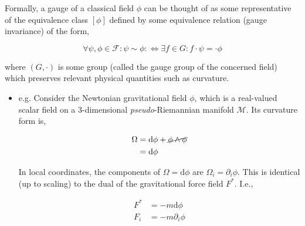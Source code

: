 \documentclass[9pt,handout]{beamer}
\begin{document}
\begin{frame}{}
\begin{definition}
Formally, a gauge of a classical field $\phi$ can be thought of as some representative of the equivalence class $\left[ \phi \right]$ defined by some equivalence relation (gauge invariance) of the form,

$$\forall \psi, \phi \in \mathcal{F} : \psi \sim \phi : \Longleftrightarrow \exists f \in G :  f \cdot \psi = \cdot \phi$$

where $\left( G, \cdot \right)$ is some group (called the gauge group of the concerned field) which preserves relevant physical quantities such as curvature.
\end{definition}

\begin{itemize}
\item e.g. Consider the Newtonian gravitational field $\phi$, which is a real-valued scalar field on a 3-dimensional \emph{pseudo}-Riemannian manifold $\mathcal{M}$. Its curvature form is,

\begin{align*}
\Omega & = \text{d}\phi + \cancel{\phi \wedge \phi} \\
& = \text{d} \phi
\end{align*}

In local coordinates, the components of $\Omega = \text{d}\phi$ are $\Omega_i = \partial_i \phi$. This is identical (up to scaling) to the dual of the gravitational force field $F^*$. I.e.,

\begin{align*}
F^* & = - m \text{d} \phi \\
F_i & = - m \partial_i \phi
\end{align*}
\end{itemize}
\end{frame}
\end{document}
